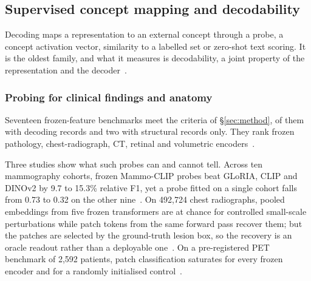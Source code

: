 \subsection{Supervised concept mapping and decodability}
\label{sec:decoding}

Decoding maps a representation to an external concept through a probe, a concept activation vector,
similarity to a labelled set or zero-shot text scoring. It is the oldest family, and what it measures is
decodability, a joint property of the representation and the
decoder~\cite{alain2016understanding,belinkov2021probing,hewitt2019designing,elazar2020amnesic}.

\subsubsection{Probing for clinical findings and anatomy}

Seventeen frozen-feature benchmarks meet the criteria of \S\ref{sec:method}, \Nbenchdec{} of them with
decoding records and two with structural records only. They rank frozen pathology, chest-radiograph, CT,
retinal and volumetric
encoders~\cite{neidlinger2025benchmark,marza2025thunder,li2025featurequality,li2025embeddings,chevli2026frozenct,zhou2025generalist,aerts2025foundation}.

Three studies show what such probes can and cannot tell. Across ten mammography cohorts, frozen
Mammo-CLIP probes beat GLoRIA, CLIP and DINOv2 by 9.7 to 15.3\% relative F1, yet a probe fitted on a
single cohort falls from 0.73 to 0.32 on the other nine~\cite{germani2025bias}. On 492,724 chest
radiographs, pooled embeddings from five frozen transformers are at chance for controlled small-scale
perturbations while patch tokens from the same forward pass recover them; but the patches are selected by
the ground-truth lesion box, so the recovery is an oracle readout rather than a deployable
one~\cite{muthyala2026frozen}. On a pre-registered PET benchmark of 2,592 patients, patch classification
saturates for every frozen encoder and for a randomly initialised control~\cite{farquhar2026pretraining}.

